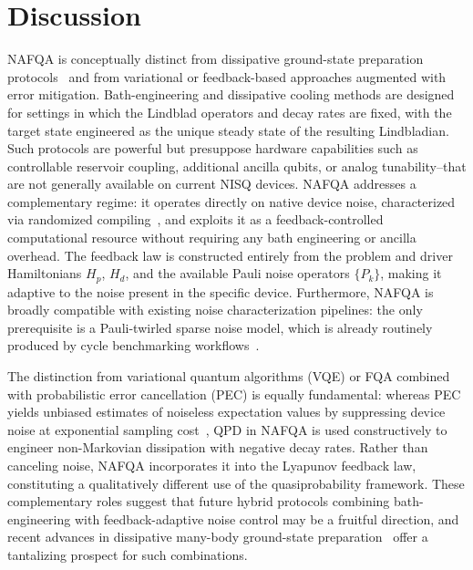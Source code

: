 \documentclass[10pt, superscriptaddress,aps,pra,twocolumn,showpacs,nofootinbib, longbibliography, notitlepage,floatfix]{revtex4-2}
\begin{document}
\section*{Discussion}
NAFQA is conceptually distinct from dissipative ground-state preparation protocols~\cite{Verstraete2009, kraus_pra_2008, science_dissipation, lin_lin_review_2025, barbara_cooling} and from variational or feedback-based approaches augmented with error mitigation. Bath-engineering and dissipative cooling methods are designed for settings in which the Lindblad operators and decay rates are fixed, with the target state engineered as the unique steady state of the resulting Lindbladian. Such protocols are powerful but presuppose hardware capabilities such as controllable reservoir coupling, additional ancilla qubits, or analog tunability--that are not generally available on current NISQ devices. NAFQA addresses a complementary regime: it operates directly on native device noise, characterized via randomized compiling~\cite{EmersonPRA2016, Flammia2020, EmersonPRX2021}, and exploits it as a feedback-controlled computational resource without requiring any bath engineering or ancilla overhead. The feedback law is constructed entirely from the problem and driver Hamiltonians $H_p$, $H_d$, and the available Pauli noise operators $\{P_k\}$, making it adaptive to the noise present in the specific device. Furthermore, NAFQA is broadly compatible with existing noise characterization pipelines: the only prerequisite is a Pauli-twirled sparse noise model, which is already routinely produced by cycle benchmarking workflows~\cite{vandenBerg2023_natphys}.

The distinction from variational quantum algorithms (VQE) or FQA combined with probabilistic error cancellation (PEC) is equally fundamental: whereas PEC yields unbiased estimates of noiseless expectation values by suppressing device noise at exponential sampling cost~\cite{Gambetta2017PRL, Cai_QEM_2023}, QPD in NAFQA is used constructively to engineer non-Markovian dissipation with negative decay rates. Rather than canceling noise, NAFQA incorporates it into the Lyapunov feedback law, constituting a qualitatively different use of the quasiprobability framework. These complementary roles suggest that future hybrid protocols combining bath-engineering with feedback-adaptive noise control may be a fruitful direction, and recent advances in dissipative many-body ground-state preparation~\cite{lin_lin_review_2025, barbara_cooling} offer a tantalizing prospect for such combinations.
\end{document}
